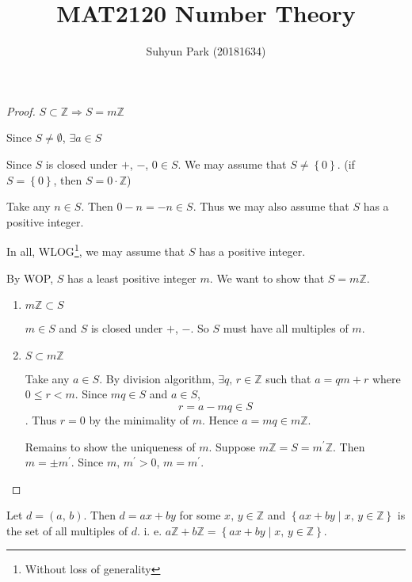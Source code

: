 
\usepackage{pgfplots}
\pgfplotsset{compat=newest}



\title{MAT2120 Number Theory}
\author{Suhyun Park (20181634)}

\begin{proof}
    $S \subset \mathbb{Z} \Rightarrow S = m\mathbb{Z}$

    Since $S \neq \emptyset$, $\exists a \in S$

    Since $S$ is closed under $+$, $-$, $0 \in S$. We may assume that
    $S \neq \left\{0\right\}$. (if $S = \left\{0\right\}$, then $S = 0\cdot \mathbb{Z}$)

    Take any $n \in S$. Then $0 - n = -n \in S$.
    Thus we may also assume that $S$ has a positive integer.

    In all, WLOG\footnote{Without loss of generality},
    we may assume that $S$ has a positive integer.

    By WOP, $S$ has a least positive integer $m$. We want to show that $S=m\mathbb{Z}$.


    \begin{enumerate}
        \item $m\mathbb{Z} \subset S$
        
        $m \in S$ and $S$ is closed under $+$, $-$. So $S$ must have all multiples of $m$.

        \item $S \subset m\mathbb{Z}$
        
        Take any $a \in S$. By division algorithm, $\exists q,\, r \in \mathbb{Z}$ such that
        $a = qm + r$ where $0 \leq r < m$.
        Since $mq \in S$ and $a \in S$, \[r = a - mq \in S\].
        Thus $r = 0$ by the minimality of $m$. Hence $a = mq \in m\mathbb{Z}$.

        Remains to show the uniqueness of $m$. Suppose $m\mathbb{Z} = S = m^\prime\mathbb{Z}$.
        Then $m = \pm m^\prime$.
        Since $m,\,m^\prime > 0$, $m=m^\prime$.
    \end{enumerate}
\end{proof}

\begin{theorem}
    Let $d=\left(a,\,b\right)$. Then $d=ax+by$ for some $x,\,y \in \mathbb{Z}$
    and $\left\{ax+by \mid x,\,y \in \mathbb{Z}\right\}$ is the set of all multiples of $d$.
    i. e. $a\mathbb{Z}+b\mathbb{Z} = \left\{ax+by \mid x,\,y \in \mathbb{Z}\right\}$.
\end{theorem}

